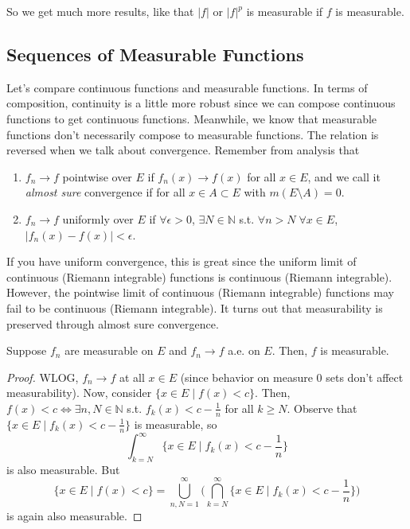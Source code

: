   So we get much more results, like that $|f|$ or $|f|^p$ is measurable if $f$ is measurable. 

\subsection{Sequences of Measurable Functions}

  Let's compare continuous functions and measurable functions. In terms of composition, continuity is a little more robust since we can compose continuous functions to get continuous functions. Meanwhile, we know that measurable functions don't necessarily compose to measurable functions. The relation is reversed when we talk about convergence. Remember from analysis that 
  \begin{enumerate}
    \item $f_n \to f$ pointwise over $E$ if $f_n (x) \to f(x)$ for all $x \in E$, and we call it \textit{almost sure} convergence if for all $x \in A \subset E$ with $m(E \setminus A) = 0$. 
    \item $f_n \to f$ uniformly over $E$ if $\forall \epsilon > 0$, $\exists N \in \mathbb{N}$ s.t. $\forall n > N \; \forall x \in E$, $|f_n (x) - f(x)| < \epsilon$. 
  \end{enumerate}

  If you have uniform convergence, this is great since the uniform limit of continuous (Riemann integrable) functions is continuous (Riemann integrable). However, the pointwise limit of continuous (Riemann integrable) functions may fail to be continuous (Riemann integrable). It turns out that measurability is preserved through almost sure convergence. 

  \begin{theorem}
    Suppose $f_n$ are measurable on $E$ and $f_n \to f$ a.e. on $E$. Then, $f$ is measurable. 
  \end{theorem}
  \begin{proof}
    WLOG, $f_n \to f$ at all $x \in E$ (since behavior on measure $0$ sets don't affect measurability). Now, consider $\{x \in E \mid f(x) < c\}$. Then, $f(x) < c \iff \exists n, N \in \mathbb{N}$ s.t. $f_k (x) < c - \frac{1}{n}$ for all $k \geq N$. Observe that $\{x \in E \mid f_k (x) < c - \frac{1}{n}\}$ is measurable, so 
    \begin{equation}
      \int_{k = N}^\infty \{ x \in E \mid f_k (x) < c - \frac{1}{n} \}
    \end{equation}
    is also measurable. But 
    \begin{equation}
      \{ x \in E \mid f(x) < c\} = \bigcup_{n, N = 1}^\infty \bigg( \bigcap_{k=N}^\infty \{ x \in E \mid f_k (x) < c - \frac{1}{n} \} \bigg) 
    \end{equation}
    is again also measurable. 
  \end{proof}

